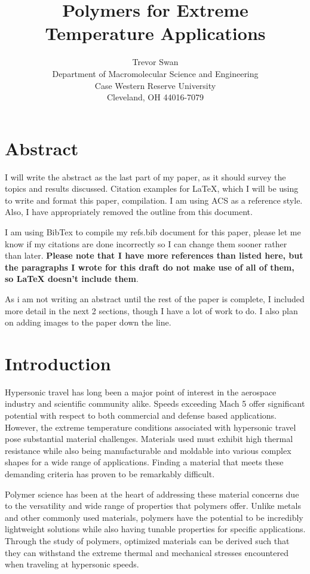 \documentclass[12pt]{article}
\title{Polymers for Extreme Temperature Applications}
\author{Trevor Swan \\
Department of Macromolecular Science and Engineering \\ 
Case Western Reserve University \\
Cleveland, OH 44016-7079}
\date{}
\begin{document}
\maketitle

\section{Abstract}

\indent I will write the abstract as the last part of my paper, as it should survey the topics and results discussed. Citation examples for LaTeX, which I will be using to write and format this paper, compilation. I am using ACS as a reference style. Also, I have appropriately removed the outline from this document.
	
\indent I am using BibTex to compile my refs.bib document for this paper, please let me know if my citations are done incorrectly so I can change them sooner rather than later. \textbf{Please note that I have more references than listed here, but the paragraphs I wrote for this draft do not make use of all of them, so LaTeX doesn't include them}.

\indent As i am not writing an abstract until the rest of the paper is complete, I included more detail in the next 2 sections, though I have a lot of work to do. I also plan on adding images to the paper down the line.

\section{Introduction}

\indent Hypersonic travel has long been a major point of interest in the aerospace industry and scientific community alike. Speeds exceeding Mach 5 offer significant potential with respect to both commercial and defense based applications. However, the extreme temperature conditions associated with hypersonic travel pose substantial material challenges. Materials used must exhibit high thermal resistance while also being manufacturable and moldable into various complex shapes for a wide range of applications. Finding a material that meets these demanding criteria has proven to be remarkably difficult.
	
\indent Polymer science has been at the heart of addressing these material concerns due to the versatility and wide range of properties that polymers offer. Unlike metals and other commonly used materials, polymers have the potential to be incredibly lightweight solutions while also having tunable properties for specific applications. Through the study of polymers, optimized materials can be derived such that they can withstand the extreme thermal and mechanical stresses encountered when traveling at hypersonic speeds. 
\end{document}
